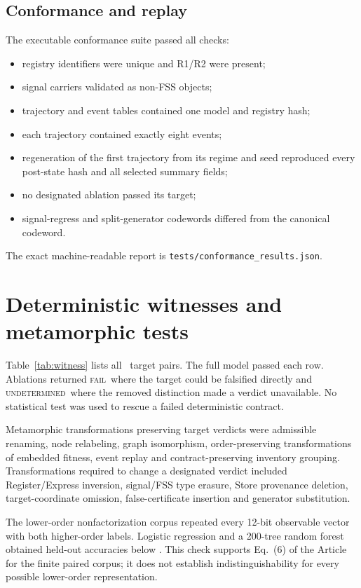 \documentclass[10pt]{article}
\newcommand{\Fail}{\textsc{fail}}
\newcommand{\Und}{\textsc{undetermined}}
\begin{document}
\subsection{Conformance and replay}
The executable conformance suite passed all checks:
\begin{itemize}
\item registry identifiers were unique and R1/R2 were present;
\item signal carriers validated as non-FSS objects;
\item trajectory and event tables contained one model and registry hash;
\item each trajectory contained exactly eight events;
\item regeneration of the first trajectory from its regime and seed reproduced every post-state hash and all selected summary fields;
\item no designated ablation passed its target;
\item signal-regress and split-generator codewords differed from the canonical codeword.
\end{itemize}
The exact machine-readable report is \texttt{tests/conformance\_results.json}.

\section{Deterministic witnesses and metamorphic tests}
Table~\ref{tab:witness} lists all \NumWitnesses\ target pairs. The full model passed each row. Ablations returned \Fail\ where the target could be falsified directly and \Und\ where the removed distinction made a verdict unavailable. No statistical test was used to rescue a failed deterministic contract.

Metamorphic transformations preserving target verdicts were admissible renaming, node relabeling, graph isomorphism, order-preserving transformations of embedded fitness, event replay and contract-preserving inventory grouping. Transformations required to change a designated verdict included Register/Express inversion, signal/FSS type erasure, Store provenance deletion, target-coordinate omission, false-certificate insertion and generator substitution.

The lower-order nonfactorization corpus repeated every 12-bit observable vector with both higher-order labels. Logistic regression and a 200-tree random forest obtained held-out accuracies below \LeakageMax. This check supports Eq.~(6) of the Article for the finite paired corpus; it does not establish indistinguishability for every possible lower-order representation.
\end{document}

